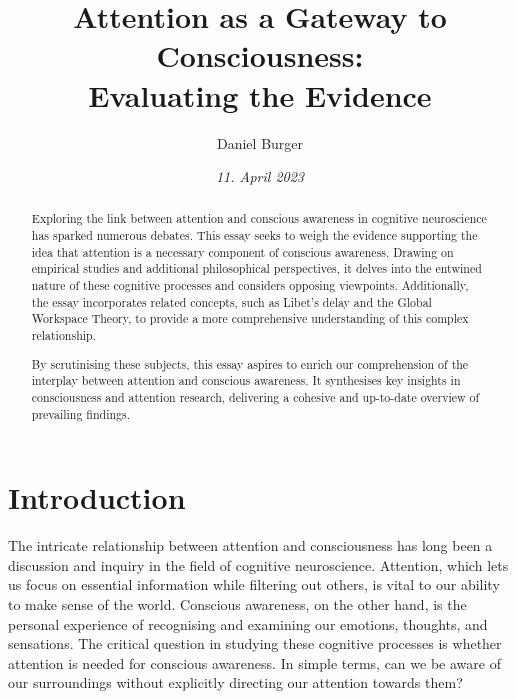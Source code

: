 \documentclass[10pt]{article}
\title{\textbf{Attention as a Gateway to Consciousness:} \\ Evaluating the Evidence}
\author[ ]{Daniel Burger}
\affil[ ]{\textbf{King’s College London}}
\affil[ ]{\href{mailto:daniel.burger@kcl.ac.uk}{daniel.burger@kcl.ac.uk}}
\date{\textit{11. April 2023}}
\begin{document}

\maketitle
\thispagestyle{empty}

\begin{sloppypar} %
  \begin{abstract}
    Exploring the link between attention and conscious awareness in cognitive neuroscience has sparked numerous debates. This essay seeks to weigh the evidence supporting the idea that attention is a necessary component of conscious awareness. Drawing on empirical studies and additional philosophical perspectives, it delves into the entwined nature of these cognitive processes and considers opposing viewpoints. Additionally, the essay incorporates related concepts, such as Libet’s delay and the Global Workspace Theory, to provide a more comprehensive understanding of this complex relationship.

    By scrutinising these subjects, this essay aspires to enrich our comprehension of the interplay between attention and conscious awareness. It synthesises key insights in consciousness and attention research, delivering a cohesive and up-to-date overview of prevailing findings.
  \end{abstract}
  \pagebreak

  \tableofcontents
  \pagebreak

  \listoffigures
  \pagebreak

  \listoftables
  \pagebreak


  \doublespacing

  \section{Introduction}
  \label{sec:introduction}

  The intricate relationship between attention and consciousness has long been a discussion and inquiry in the field of cognitive neuroscience. Attention, which lets us focus on essential information while filtering out others, is vital to our ability to make sense of the world. Conscious awareness, on the other hand, is the personal experience of recognising and examining our emotions, thoughts, and sensations. The critical question in studying these cognitive processes is whether attention is needed for conscious awareness. In simple terms, can we be aware of our surroundings without explicitly directing our attention towards them?


\end{sloppypar}
\end{document}
